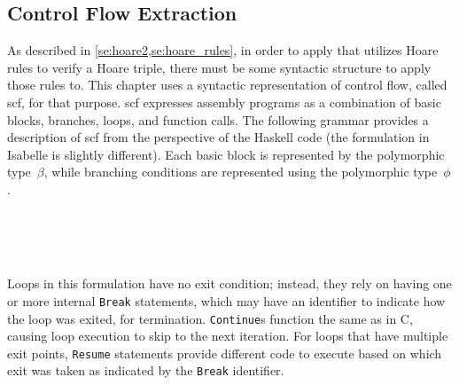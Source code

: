 \subsection{Control Flow Extraction}\label{sse:cfg_extract}
As described in \cref{se:hoare2,se:hoare_rules},
in order to apply  that utilizes Hoare rules to verify a Hoare triple,
there must be some syntactic structure to apply those rules to.
This chapter uses a syntactic representation of control flow, called \ac{scf},
for that purpose.
\Ac{scf} expresses assembly programs as a combination of basic blocks, branches, loops,
and function calls.
The following grammar provides a description of \ac{scf}
from the perspective of the Haskell code
(the formulation in Isabelle is slightly different).
Each basic block is represented by the polymorphic type~$\beta$,%
while branching conditions are represented using the polymorphic type~$\phi$.%
\begin{bnf}
   \\
   \\
   \\
\end{bnf}
Loops in this formulation have no exit condition;
instead, they rely on having one or more internal \texttt{Break} statements,
which may have an identifier to indicate how the loop was exited, for termination.
\texttt{Continue}s function the same as in C,
causing loop execution to skip to the next iteration.
For loops that have multiple exit points,
\texttt{Resume} statements provide different code to execute
based on which exit was taken as indicated by the \texttt{Break} identifier.

